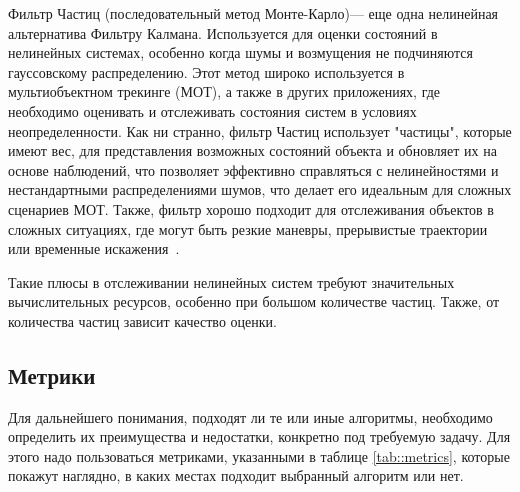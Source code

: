 Фильтр Частиц (последовательный метод Монте-Карло)--- еще одна нелинейная альтернатива Фильтру Калмана. Используется для оценки состояний в нелинейных системах, особенно когда шумы и возмущения не подчиняются гауссовскому распределению. Этот метод широко используется в мультиобъектном трекинге (МОТ), а также в других приложениях, где необходимо оценивать и отслеживать состояния систем в условиях неопределенности. Как ни странно, фильтр Частиц использует "частицы", которые имеют вес, для представления возможных состояний объекта и обновляет их на основе наблюдений, что позволяет эффективно справляться с нелинейностями и нестандартными распределениями шумов, что делает его идеальным для сложных сценариев МОТ. Также, фильтр хорошо подходит для отслеживания объектов в сложных ситуациях, где могут быть резкие маневры, прерывистые траектории или временные искажения~\cite{Yang2009}.

Такие плюсы в отслеживании нелинейных систем требуют значительных вычислительных ресурсов, особенно при большом количестве частиц. Также, от количества частиц зависит качество оценки. 
	
\subsection{Метрики}

Для дальнейшего понимания, подходят ли те или иные алгоритмы, необходимо определить их преимущества и недостатки, конкретно под требуемую задачу. Для этого надо пользоваться метриками, указанными в таблице \ref{tab::metrics}, которые покажут наглядно, в каких местах подходит выбранный алгоритм или нет.

